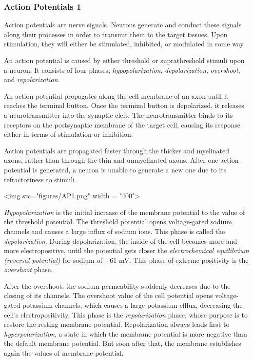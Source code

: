 \subsubsection{Action Potentials 1}

Action potentials are nerve signals. Neurons generate and conduct these signals along their processes in order to transmit them to the target tissues. Upon stimulation, they will either be stimulated, inhibited, or modulated in some way

An action potential is caused by either threshold or suprathreshold stimuli upon a neuron. It consists of four phases; \textit{hypopolarization}, \textit{depolarization}, \textit{overshoot}, and \textit{repolarization}. 

An action potential propagates along the cell membrane of an axon until it reaches the terminal button. Once the terminal button is depolarized, it releases a neurotransmitter into the synaptic cleft. The neurotransmitter binds to its receptors on the postsynaptic membrane of the target cell, causing its response either in terms of stimulation or inhibition.

Action potentials are propagated faster through the thicker and myelinated axons, rather than through the thin and unmyelinated axons. After one action potential is generated, a neuron is unable to generate a new one due to its refractoriness to stimuli.

<img src="figures/AP1.png" width = "400">


\textit{Hypopolarization} is the initial increase of the membrane potential to the value of the threshold potential. The threshold potential opens voltage-gated sodium channels and causes a large influx of sodium ions. This phase is called the \textit{depolarization}. During depolarization, the inside of the cell becomes more and more electropositive, until the potential gets closer the \textit{electrochemical equilibrium (reversal potential)} for sodium of +61 mV. This phase of extreme positivity is the \textit{overshoot} phase.

After the overshoot, the sodium permeability suddenly decreases due to the closing of its channels. The overshoot value of the cell potential opens voltage-gated potassium channels, which causes a large potassium efflux, decreasing the cell’s electropositivity. This phase is the \textit{repolarization} phase, whose purpose is to restore the resting membrane potential. Repolarization always leads first to \textit{hyperpolarization}, a state in which the membrane potential is more negative than the default membrane potential. But soon after that, the membrane establishes again the values of membrane potential.
